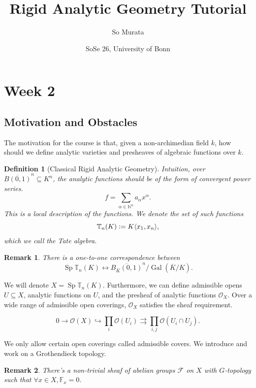 \documentclass[10pt]{article}
\title{Rigid Analytic Geometry Tutorial}
\author{So Murata}
\date{SoSe 26, University of Bonn}
\numberwithin{equation}{section}
\newtheorem{definition}{Definition}[section]
\newtheorem{remark}{Remark}[section]
\DeclareMathOperator{\Sp}{Sp}
\DeclareMathOperator{\Gal}{Gal}
\newcommand{\defeq}{\vcentcolon=}
\newcommand{\Ouv}{\mathcal{O}}
\newcommand{\N}[0]{\mathbb{N}}
\newcommand{\F}[0]{\mathbb{F}}
\newcommand{\T}[0]{\mathbb{T}}
\begin{document}
\maketitle


\section{Week 2}
\subsection{Motivation and Obstacles}
The motivation for the course is that, given a non-archimedian field $k$, how should we define analytic varieties and presheaves of algebraic functions over $k$.

\begin{definition}[Classical Rigid Analytic Geometry]
  Intuition, over $\overline{B(0,1)}^n\subseteq K^n$, the analytic functions should be of the form of convergent power series.
  \begin{equation*}
    f = \sum_{\alpha\in\N^n}a_\alpha x^\alpha.
  \end{equation*}
  This is a local description of the functions. We denote the set of such functions 
  \begin{equation*}
    \T_n(K)\defeq K\langle x_1,x_n\rangle,
  \end{equation*}
  which we call the Tate algebra. 
\end{definition}

\begin{remark}
  There is a one-to-one correspondence between 
  \begin{equation*}
    \Sp\T_n(K)\longleftrightarrow \overline{B_{\overline{K}}(0,1)}^n/\Gal(\overline{K}/K).
  \end{equation*}
\end{remark}

We will denote $X=\Sp\T_n(K)$. Furthermore, we can define admissible opens $U\subseteq X$, analytic functions on $U$, and the presheaf of analytic functions $\Ouv_{X}$.
Over a wide range of admissible open coverings, $\Ouv_{X}$ satisfies the sheaf requirement.

\begin{equation*}
  0\to\Ouv(X)\hookrightarrow\prod_{i}\Ouv(U_i)\rightrightarrows\prod_{i,j}\Ouv(U_i\cap U_j).
\end{equation*}

We only allow certain open coverings called admissible covers. We introduce and work on a Grothendieck topology.
\begin{remark}
  There's a non-trivial sheaf of abelian groups $\mathcal{F}$ on $X$ with $G$-topology such that $\forall x\in X,\F_x=0$.
\end{remark}
\end{document}
